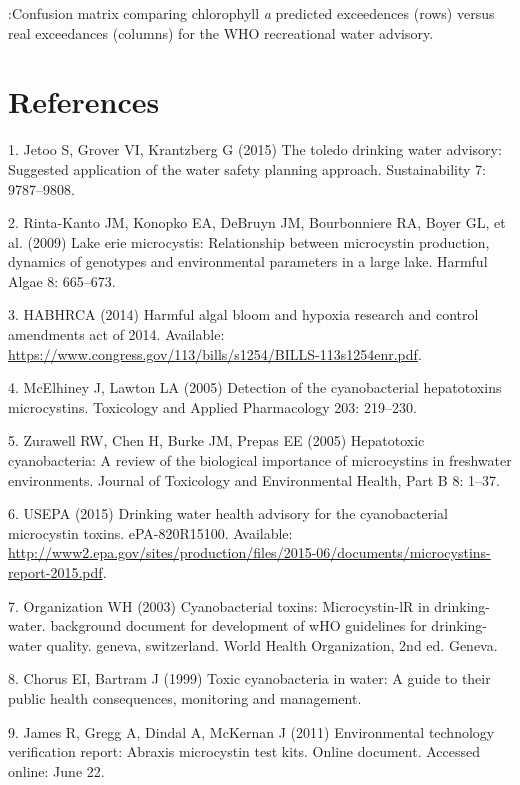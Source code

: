 \documentclass[10pt,a4paper,twocolumn]{article}
\begin{document}
:Confusion matrix comparing chlorophyll \textit{a} predicted exceedences
(rows) versus real exceedances (columns) for the WHO recreational water
advisory. \label{tab:who_rec_conmat_table}

\newpage

\section*{References}\label{references}

1. Jetoo S, Grover VI, Krantzberg G (2015) The toledo drinking water
advisory: Suggested application of the water safety planning approach.
Sustainability 7: 9787--9808.

2. Rinta-Kanto JM, Konopko EA, DeBruyn JM, Bourbonniere RA, Boyer GL, et
al. (2009) Lake erie microcystis: Relationship between microcystin
production, dynamics of genotypes and environmental parameters in a
large lake. Harmful Algae 8: 665--673.

3. HABHRCA (2014) Harmful algal bloom and hypoxia research and control
amendments act of 2014. Available:
\url{https://www.congress.gov/113/bills/s1254/BILLS-113s1254enr.pdf}.

4. McElhiney J, Lawton LA (2005) Detection of the cyanobacterial
hepatotoxins microcystins. Toxicology and Applied Pharmacology 203:
219--230.

5. Zurawell RW, Chen H, Burke JM, Prepas EE (2005) Hepatotoxic
cyanobacteria: A review of the biological importance of microcystins in
freshwater environments. Journal of Toxicology and Environmental Health,
Part B 8: 1--37.

6. USEPA (2015) Drinking water health advisory for the cyanobacterial
microcystin toxins. ePA-820R15100. Available:
\url{http://www2.epa.gov/sites/production/files/2015-06/documents/microcystins-report-2015.pdf}.

7. Organization WH (2003) Cyanobacterial toxins: Microcystin-lR in
drinking-water. background document for development of wHO guidelines
for drinking-water quality. geneva, switzerland. World Health
Organization, 2nd ed. Geneva.

8. Chorus EI, Bartram J (1999) Toxic cyanobacteria in water: A guide to
their public health consequences, monitoring and management.

9. James R, Gregg A, Dindal A, McKernan J (2011) Environmental
technology verification report: Abraxis microcystin test kits. Online
document. Accessed online: June 22.
\end{document}
